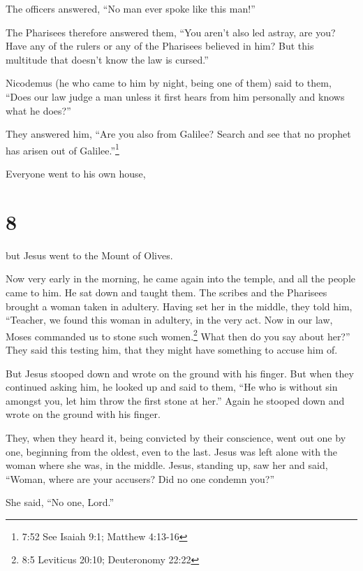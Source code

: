  The officers answered, ``No man ever spoke like this
man!''

 The Pharisees therefore answered them, ``You aren't also
led astray, are you?  Have any of the rulers or any of the
Pharisees believed in him?  But this multitude that doesn't
know the law is cursed.''

 Nicodemus (he who came to him by night, being one of them)
said to them,  ``Does our law judge a man unless it first
hears from him personally and knows what he does?''

 They answered him, ``Are you also from Galilee? Search and
see that no prophet has arisen out of Galilee.''\footnote{7:52 See
  Isaiah 9:1; Matthew 4:13-16}

 Everyone went to his own house,

\hypertarget{section-7}{%
\section{8}\label{section-7}}

 but Jesus went to the Mount of Olives.

 Now very early in the morning, he came again into the
temple, and all the people came to him. He sat down and taught them.
 The scribes and the Pharisees brought a woman taken in
adultery. Having set her in the middle,  they told him,
``Teacher, we found this woman in adultery, in the very act.
 Now in our law, Moses commanded us to stone such
women.\footnote{8:5 Leviticus 20:10; Deuteronomy 22:22} What then do you
say about her?''  They said this testing him, that they
might have something to accuse him of.

But Jesus stooped down and wrote on the ground with his finger.
 But when they continued asking him, he looked up and said
to them, ``He who is without sin amongst you, let him throw the first
stone at her.''  Again he stooped down and wrote on the
ground with his finger.

 They, when they heard it, being convicted by their
conscience, went out one by one, beginning from the oldest, even to the
last. Jesus was left alone with the woman where she was, in the middle.
 Jesus, standing up, saw her and said, ``Woman, where are
your accusers? Did no one condemn you?''

 She said, ``No one, Lord.''

